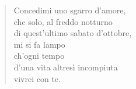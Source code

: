 
\begin{verse}
    Concedimi uno sgarro d'amore,\\
    che solo, al freddo notturno\\
    di quest'ultimo sabato d'ottobre,\\
    mi si fa lampo\\
    ch'ogni tempo\\
    d'una vita altresì incompiuta\\
    vivrei con te.
\end{verse}